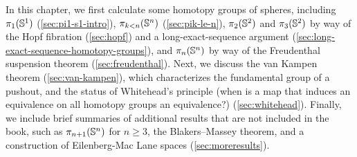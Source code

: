 In this chapter, we first calculate some homotopy groups of spheres,
including $\pi_1(\mathbb{S} ^1)$ (\autoref{sec:pi1-s1-intro}), $\pi_{k<n}(\mathbb{S}
^n)$ (\autoref{sec:pik-le-n}), $\pi_2(\mathbb{S} ^2)$ and $\pi_3(\mathbb{S} ^2)$ by
way of the Hopf fibration (\autoref{sec:hopf}) and a long-exact-sequence
argument (\autoref{sec:long-exact-sequence-homotopy-groups}), and
$\pi_n(\mathbb{S} ^n)$ by way of the Freudenthal suspension theorem
(\autoref{sec:freudenthal}).  Next, we discuss the van Kampen theorem
(\autoref{sec:van-kampen}), which characterizes the fundamental group of
a pushout, and the status of Whitehead's principle (when is a map that
induces an equivalence on all homotopy groups an equivalence?)
(\autoref{sec:whitehead}).  Finally, we include brief summaries of
additional results that are not included in the book, such as
$\pi_{n+1}(\mathbb{S} ^n)$ for $n\ge 3$, the Blakers--Massey theorem, and a
construction of Eilenberg-Mac Lane spaces (\autoref{sec:moreresults}).






